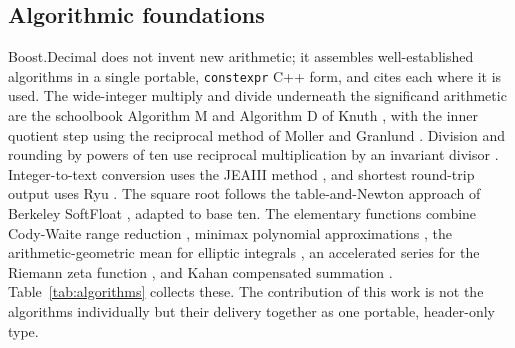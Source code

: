 \documentclass[acmsmall]{acmart}
\begin{document}
\subsection{Algorithmic foundations}
Boost.Decimal does not invent new arithmetic; it assembles well-established algorithms in a
single portable, \texttt{constexpr} C++ form, and cites each where it is used. The
wide-integer multiply and divide underneath the significand arithmetic are the schoolbook
Algorithm M and Algorithm D of Knuth \cite{knuth_taocp2}, with the inner quotient step using
the reciprocal method of Moller and Granlund \cite{moller_granlund2011}. Division and
rounding by powers of ten use reciprocal multiplication by an invariant divisor
\cite{granlund_montgomery1994, warren_hd}. Integer-to-text conversion uses the JEAIII method
\cite{jeaiii}, and shortest round-trip output uses Ryu \cite{ryu}. The square root follows
the table-and-Newton approach of Berkeley SoftFloat \cite{softfloat}, adapted to base ten.
The elementary functions combine Cody-Waite range reduction \cite{cody_waite1980}, minimax
polynomial approximations \cite{muller2016}, the arithmetic-geometric mean for elliptic
integrals \cite{dlmf, algorithm910}, an accelerated series for the Riemann zeta function
\cite{borwein1995}, and Kahan compensated summation \cite{kahan1965}.
Table~\ref{tab:algorithms} collects these. The contribution of this work is not the
algorithms individually but their delivery together as one portable, header-only type.
\end{document}
